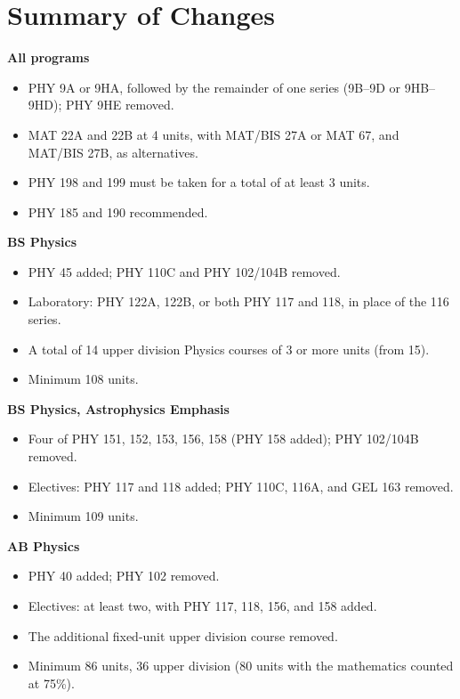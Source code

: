 \documentclass[10pt]{article}
\begin{document}
\section*{Summary of Changes}

\textbf{All programs}
\begin{itemize}
\item PHY 9A or 9HA, followed by the remainder of one series (9B--9D or 9HB--9HD);  PHY 9HE removed.
\item MAT 22A and 22B at 4 units, with MAT/BIS 27A or MAT 67, and MAT/BIS 27B, as alternatives.
\item PHY 198 and 199 must be taken for a total of at least 3 units.
\item PHY 185 and 190 recommended.
\end{itemize}

\textbf{BS Physics}
\begin{itemize}
\item PHY 45 added;  PHY 110C and PHY 102/104B removed.
\item Laboratory:  PHY 122A, 122B, or both PHY 117 and 118, in place of the 116 series.
\item A total of 14 upper division Physics courses of 3 or more units (from 15).
\item Minimum 108 units.
\end{itemize}

\textbf{BS Physics, Astrophysics Emphasis}
\begin{itemize}
\item Four of PHY 151, 152, 153, 156, 158 (PHY 158 added);  PHY 102/104B removed.
\item Electives:  PHY 117 and 118 added;  PHY 110C, 116A, and GEL 163 removed.
\item Minimum 109 units.
\end{itemize}

\textbf{AB Physics}
\begin{itemize}
\item PHY 40 added;  PHY 102 removed.
\item Electives:  at least two, with PHY 117, 118, 156, and 158 added.
\item The additional fixed-unit upper division course removed.
\item Minimum 86 units, 36 upper division (80 units with the mathematics counted at 75\%).
\end{itemize}
\end{document}
